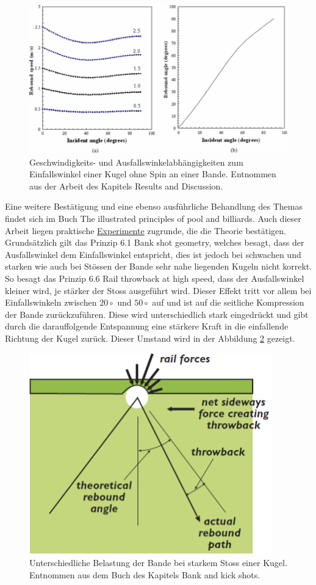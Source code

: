 \begin{figure}[h!]
    \begin{center}
        \includegraphics[width=0.5\linewidth]{../common/03_billiard_ai/resources/55_rail_rebound_angle_no_spin.png}
    \end{center}
    \caption{Geschwindigkeits- und Ausfallswinkelabhängigkeiten zum Einfallswinkel einer Kugel ohne Spin an einer Bande.
    Entnommen aus der Arbeit \cite{10.1243/09544062JMES1964} des Kapitels \glqq Results and Discussion\grqq. }
    \label{fig:rail_rebound_angle_no_spin}
\end{figure}

Eine weitere Bestätigung und eine ebenso ausführliche Behandlung des Themas findet sich im Buch \glqq The illustrated principles
of pool and billiards\grqq. Auch dieser Arbeit liegen praktische
\href{https://billiards.colostate.edu/high-speed-video/}{Experimente} zugrunde, die die Theorie bestätigen.
Grundsätzlich gilt das Prinzip 6.1 \glqq Bank shot geometry\grqq, welches besagt, dass
der Ausfallswinkel dem Einfallswinkel entspricht, dies ist
jedoch bei schwachen und starken wie auch bei Stössen der Bande sehr nahe liegenden Kugeln nicht korrekt\cite{book:the_ilustrated_principles_of_pool_and_billiards}.
So besagt das Prinzip 6.6 \glqq Rail throwback at high speed\grqq, dass der Ausfallswinkel kleiner wird, je stärker der Stoss ausgeführt wird.
Dieser Effekt tritt vor allem bei Einfallswinkeln zwischen $20\circ$ und $50\circ$ auf und ist auf
die seitliche Kompression der Bande zurückzuführen. Diese wird unterschiedlich stark eingedrückt und gibt durch die
darauffolgende Entspannung eine stärkere Kraft in die einfallende Richtung der Kugel zurück\cite{book:the_ilustrated_principles_of_pool_and_billiards}.
Dieser Umstand wird in der Abbildung \ref{fig:rebound_angle_no_spin_fast_shot} gezeigt.

\begin{figure}[h!]
    \begin{center}
        \includegraphics[width=0.3\linewidth]{../common/03_billiard_ai/resources/56_rebound_angle_no_spin_fast_shot.png}
    \end{center}
    \caption{Unterschiedliche Belastung der Bande bei starkem Stoss einer Kugel.
    Entnommen aus dem Buch \cite{book:the_ilustrated_principles_of_pool_and_billiards} des Kapitels  Bank and kick shots\grqq.}
    \label{fig:rebound_angle_no_spin_fast_shot}
\end{figure}

